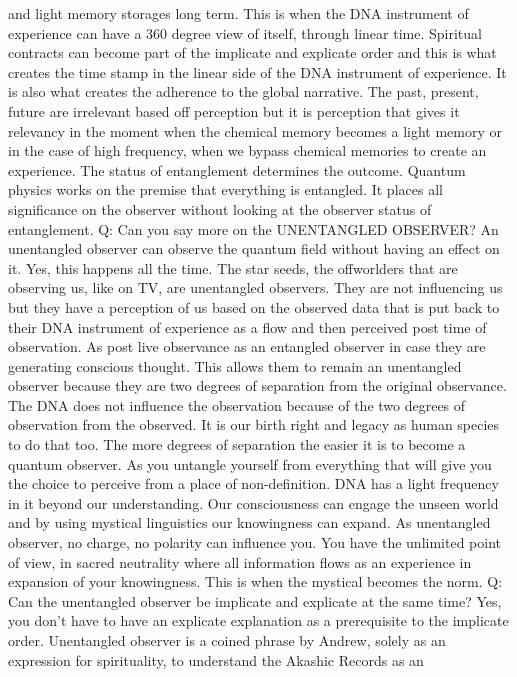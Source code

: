 and light memory storages long term. This is when the DNA instrument of
experience can have a 360 degree view of itself, through linear time.
Spiritual contracts can become part of the implicate and explicate order
and this is what creates the time stamp in the linear side of the DNA
instrument of experience. It is also what creates the adherence to the
global narrative. The past, present, future are irrelevant based off
perception but it is perception that gives it relevancy in the moment
when the chemical memory becomes a light memory or in the case of high
frequency, when we bypass chemical memories to create an experience. The
status of entanglement determines the outcome. Quantum physics works on
the premise that everything is entangled. It places all significance on
the observer without looking at the observer status of entanglement. Q:
Can you say more on the UNENTANGLED OBSERVER? An unentangled observer
can observe the quantum field without having an effect on it. Yes, this
happens all the time. The star seeds, the offworlders that are observing
us, like on TV, are unentangled observers. They are not influencing us
but they have a perception of us based on the observed data that is put
back to their DNA instrument of experience as a flow and then perceived
post time of observation. As post live observance as an entangled
observer in case they are generating conscious thought. This allows them
to remain an unentangled observer because they are two degrees of
separation from the original observance. The DNA does not influence the
observation because of the two degrees of observation from the observed.
It is our birth right and legacy as human species to do that too. The
more degrees of separation the easier it is to become a quantum
observer. As you untangle yourself from everything that will give you
the choice to perceive from a place of non-definition. DNA has a light
frequency in it beyond our understanding. Our consciousness can engage
the unseen world and by using mystical linguistics our knowingness can
expand. As unentangled observer, no charge, no polarity can influence
you. You have the unlimited point of view, in sacred neutrality where
all information flows as an experience in expansion of your knowingness.
This is when the mystical becomes the norm. Q: Can the unentangled
observer be implicate and explicate at the same time? Yes, you don't
have to have an explicate explanation as a prerequisite to the implicate
order. Unentangled observer is a coined phrase by Andrew, solely as an
expression for spirituality, to understand the Akashic Records as an
